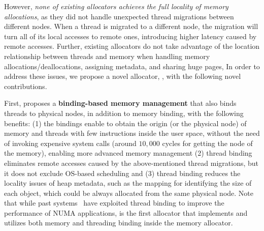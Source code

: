 However, \textit{none of existing allocators achieves the full locality of memory allocations}, as they did not handle unexpected thread migrations between different nodes. When a thread is migrated to a different node, the migration will turn all of its local accesses to remote ones, introducing higher latency caused by remote accesses. Further, existing allocators do not take advantage of the location relationship between threads and memory when handling memory allocations/deallocations, assigning metadata, and sharing huge pages,  In order to address these issues, we propose a novel allocator, \NM{}, with the following novel contributions.  


First, \NM{} proposes a \textbf{binding-based memory management} that also binds threads to physical nodes, in addition to memory binding, with the following benefits: (1) the bindings enable \NM{} to obtain the origin (or the physical node) of memory and threads with few instructions inside the user space, without the need of invoking expensive system calls (around  $10,000$ cycles for getting the node of the memory), enabling more advanced memory management 
(2) thread binding eliminates remote accesses caused by the above-mentioned thread migrations, but it does not exclude OS-based scheduling 
and (3) thread binding reduces the locality issues of heap metadata, such as the mapping for identifying the size of each object, which could be always allocated from the same physical node. Note that while past systems~\cite{li2013numa, XuNuma, Lepers:2015:TMP:2813767.2813788} have exploited thread binding to improve the performance of NUMA applications, \NM{} is the first allocator that implements and utilizes both memory and threading binding inside the memory allocator. 

